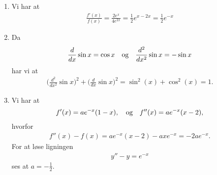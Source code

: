 \begin{enumerate}
	\item Vi har at
	\begin{align*}
	\frac{f'(x)}{f(x)}=\frac{2e^x}{4e^{2x}}=\frac{1}{2}e^{x-2x}=\frac{1}{2}e^{-x}
	\end{align*}
		
	
	
	\item Da
	\begin{align*}
	\frac{d}{dx} \sin x=\cos x\quad \textup{og} \quad \frac{d^2}{dx^2}\sin x=-\sin x
	\end{align*}
	har vi at
	\begin{align*}
	\Big(\frac{d^2}{dx^2}\sin x\Big)^2+\Big(\frac{d}{dx}\sin x\Big)^2=\sin^2(x)+\cos^2(x)=1.
	\end{align*}

	\item Vi har at
	\begin{align*}
	f'(x)=ae^{-x}(1-x),\quad \textup{og} \quad f''(x)=ae^{-x}(x-2),
	\end{align*}
	hvorfor 
	\begin{align*}
	f''(x)-f(x)=ae^{-x}(x-2)-axe^{-x}=-2ae^{-x}.
	\end{align*}
	For at løse ligningen
	\begin{align*}
	y''-y=e^{-x}
	\end{align*}
	ses at $a=-\frac{1}{2}$.
	
\end{enumerate}